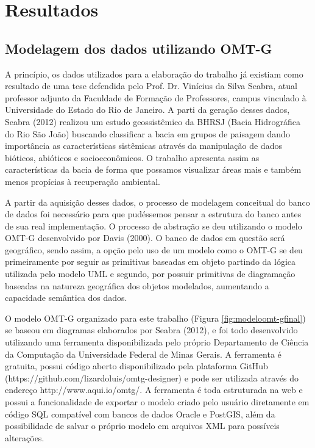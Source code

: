 \chapter{Resultados}
\section{Modelagem dos dados utilizando OMT-G}
A princípio, os dados utilizados para a elaboração do trabalho já existiam como resultado de uma tese defendida pelo Prof. Dr. Vinícius da Silva Seabra, atual professor adjunto da Faculdade de Formação de Professores, campus vinculado à Universidade do Estado do Rio de Janeiro. A parti da geração desses dados, Seabra (2012) realizou um estudo geossistêmico da BHRSJ (Bacia Hidrográfica do Rio São João) buscando classificar a bacia em grupos de paisagem dando importância as características sistêmicas através da manipulação de dados bióticos, abióticos e socioeconômicos. O trabalho apresenta assim as características da bacia de forma que possamos visualizar áreas mais e também menos propícias à recuperação ambiental.

A partir da aquisição desses dados, o processo de modelagem conceitual do banco de dados foi necessário para que pudéssemos pensar a estrutura do banco antes de sua real implementação. O processo de abstração se deu utilizando o modelo OMT-G desenvolvido por Davis (2000). O banco de dados em questão será geográfico, sendo assim, a opção pelo uso de um modelo como o OMT-G se deu primeiramente por seguir as primitivas baseadas em objeto partindo da lógica utilizada pelo modelo UML e segundo, por possuir primitivas de diagramação baseadas na natureza geográfica dos objetos modelados, aumentando a capacidade semântica dos dados.

O modelo OMT-G organizado para este trabalho (Figura \ref{fig:modeloomt-gfinal}) se baseou em diagramas elaborados por Seabra (2012)\cite{SEABRA}, e foi todo desenvolvido utilizando uma ferramenta disponibilizada pelo próprio Departamento de Ciência da Computação da Universidade Federal de Minas Gerais. A ferramenta é gratuita, possui código aberto disponibilizado pela plataforma GitHub (https://github.com/lizardoluis/omtg-designer) e pode ser utilizada através do endereço http://www.aqui.io/omtg/. A ferramenta é toda estruturada na web e possui a funcionalidade de exportar o modelo criado pelo usuário diretamente em código SQL compatível com bancos de dados Oracle e PostGIS, além da possibilidade de salvar o próprio modelo em arquivos XML para possíveis alterações.

